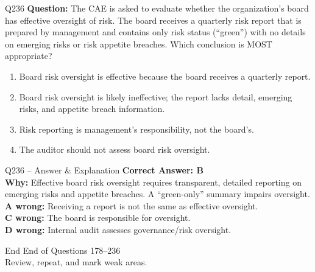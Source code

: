 \documentclass[aspectratio=169,10pt]{beamer}
\begin{document}
	\begin{frame}[t]{Q236}
		\small
		\textbf{Question:} The CAE is asked to evaluate whether the organization's board has effective oversight of risk. The board receives a quarterly risk report that is prepared by management and contains only risk status (``green'') with no details on emerging risks or risk appetite breaches. Which conclusion is MOST appropriate?
		\begin{enumerate}[label=\Alph*.,itemsep=1pt,topsep=2pt]
			\item Board risk oversight is effective because the board receives a quarterly report.
			\item Board risk oversight is likely ineffective; the report lacks detail, emerging risks, and appetite breach information.
			\item Risk reporting is management's responsibility, not the board's.
			\item The auditor should not assess board risk oversight.
		\end{enumerate}
	\end{frame}
	
	\begin{frame}[t]{Q236 -- Answer \& Explanation}
		\small
		\textbf{Correct Answer: B} \\[4pt]
		\textbf{Why:} Effective board risk oversight requires transparent, detailed reporting on emerging risks and appetite breaches. A ``green-only'' summary impairs oversight. \\[4pt]
		\textbf{A wrong:} Receiving a report is not the same as effective oversight. \\[2pt]
		\textbf{C wrong:} The board is responsible for oversight. \\[2pt]
		\textbf{D wrong:} Internal audit assesses governance/risk oversight.
	\end{frame}
	
	\begin{frame}{End}
		\centering
		\Large End of Questions 178--236\\[8pt]
		\normalsize Review, repeat, and mark weak areas.
	\end{frame}
	
\end{document}
